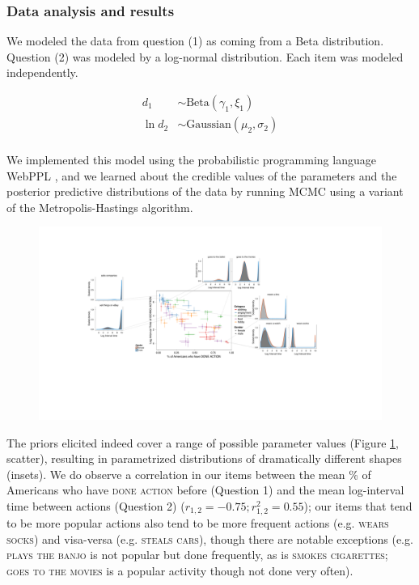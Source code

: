 \documentclass[10pt,letterpaper]{article}
\begin{document}
\subsubsection{Data analysis and results}

We modeled the data from question (1) as coming from a Beta distribution. 
Question (2) was modeled by a log-normal distribution. 
Each item was modeled independently.
%
\begin{minipage}{0.5 \textwidth} \small
\begin{align*}
d_{1} &\sim \text{Beta}(\gamma_{1}, \xi_{1}) \\
\ln d_{2} &\sim \text{Gaussian}(\mu_{2}, \sigma_{2}) \\
\end{align*}
\end{minipage}
%
We implemented this model using the probabilistic programming language WebPPL \cite{dippl}, and we learned about the credible values of the parameters and the posterior predictive distributions of the data by running MCMC using a variant of the Metropolis-Hastings algorithm.
%
\begin{figure}[t]
\centering
  \includegraphics[width=\textwidth]{prior-scatter-insets}
  \caption{}
  \label{fig:priorScatter}
\end{figure}
%

The priors elicited indeed cover a range of possible parameter values (Figure \ref{fig:priorScatter}, scatter), resulting in parametrized distributions of dramatically different shapes (insets).  
We do observe a correlation in our items between the mean \% of Americans who have \textsc{done action} before (Question 1) and the mean log-interval time between actions (Question 2) ($r_{1,2} = -0.75; r^2_{1,2} = 0.55$); our items that tend to be more popular actions also tend to be more frequent actions (e.g. \textsc{wears socks}) and visa-versa (e.g. \textsc{steals cars}), though there are notable exceptions (e.g. \textsc{plays the banjo} is not popular but done frequently, as is \textsc{smokes cigarettes}; \textsc{goes to the movies} is a popular activity though not done very often). 
\end{document}
